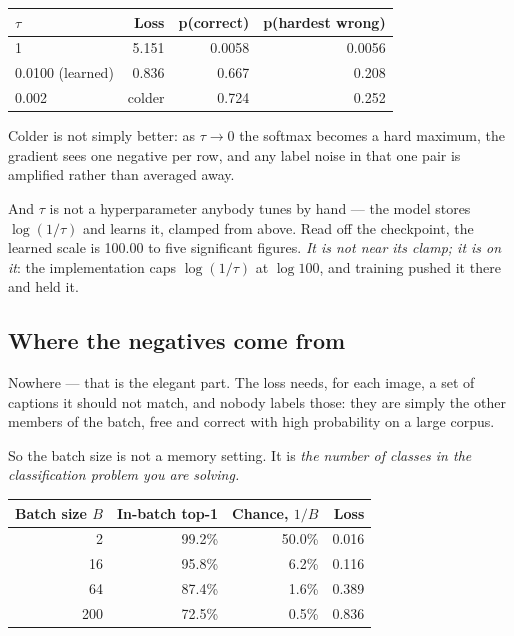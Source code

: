 \documentclass[11pt,a4paper]{article}
\begin{document}
\begin{center}
\small
\begin{tabular}{lrrr}
\toprule
$\tau$ & \textbf{Loss} & \textbf{p(correct)} & \textbf{p(hardest wrong)} \\
\midrule
1 & 5.151 & 0.0058 & 0.0056 \\
0.0100 (learned) & 0.836 & 0.667 & 0.208 \\
0.002 & colder & 0.724 & 0.252 \\
\bottomrule
\end{tabular}
\end{center}

Colder is not simply better: as $\tau \to 0$ the softmax becomes a hard
maximum, the gradient sees one negative per row, and any label noise in that
one pair is amplified rather than averaged away.

And $\tau$ is not a hyperparameter anybody tunes by hand --- the model stores
$\log(1/\tau)$ and learns it, clamped from above. Read off the checkpoint, the
learned scale is 100.00 to five significant figures. \emph{It is not near its
clamp; it is on it}: the implementation caps $\log(1/\tau)$ at $\log 100$, and
training pushed it there and held it.

\subsection{Where the negatives come from}

Nowhere --- that is the elegant part. The loss needs, for each image, a set of
captions it should not match, and nobody labels those: they are simply the
other members of the batch, free and correct with high probability on a large
corpus.

\begin{keybox}[title={The batch is the label set}]
So the batch size is not a memory setting. It is \emph{the number of classes in
the classification problem you are solving.}
\end{keybox}

\begin{center}
\small
\begin{tabular}{rrrr}
\toprule
\textbf{Batch size $B$} & \textbf{In-batch top-1} & \textbf{Chance, $1/B$} &
\textbf{Loss} \\
\midrule
  2 & 99.2\% & 50.0\% & 0.016 \\
 16 & 95.8\% &  6.2\% & 0.116 \\
 64 & 87.4\% &  1.6\% & 0.389 \\
200 & 72.5\% &  0.5\% & 0.836 \\
\bottomrule
\end{tabular}
\end{center}
\end{document}
